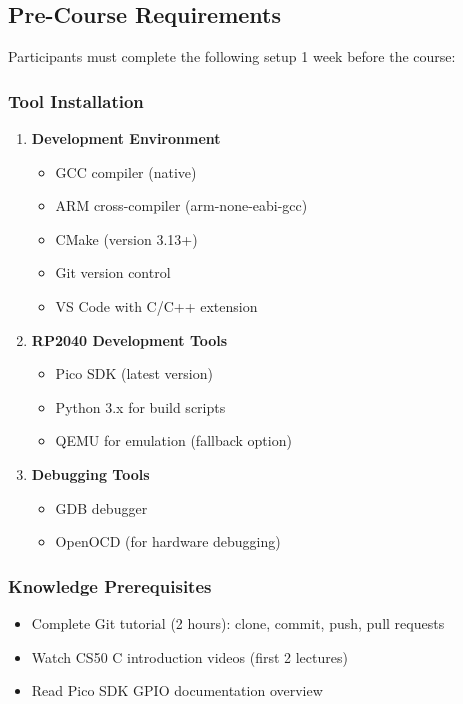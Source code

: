 \documentclass[11pt,a4paper]{article}
\begin{document}
\subsection{Pre-Course Requirements}
Participants must complete the following setup 1 week before the course:

\subsubsection{Tool Installation}
\begin{enumerate}
    \item \textbf{Development Environment}
    \begin{itemize}
        \item GCC compiler (native)
        \item ARM cross-compiler (arm-none-eabi-gcc)
        \item CMake (version 3.13+)
        \item Git version control
        \item VS Code with C/C++ extension
    \end{itemize}

    \item \textbf{RP2040 Development Tools}
    \begin{itemize}
        \item Pico SDK (latest version)
        \item Python 3.x for build scripts
        \item QEMU for emulation (fallback option)
    \end{itemize}

    \item \textbf{Debugging Tools}
    \begin{itemize}
        \item GDB debugger
        \item OpenOCD (for hardware debugging)
    \end{itemize}
\end{enumerate}

\subsubsection{Knowledge Prerequisites}
\begin{itemize}
    \item Complete Git tutorial (2 hours): clone, commit, push, pull requests
    \item Watch CS50 C introduction videos (first 2 lectures)
    \item Read Pico SDK GPIO documentation overview
\end{itemize}
\end{document}
